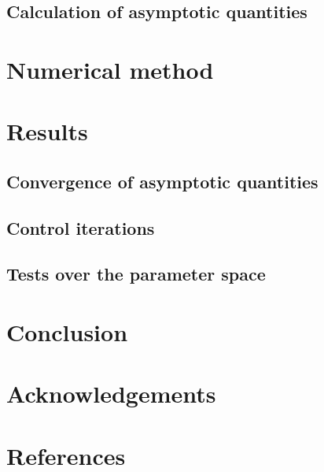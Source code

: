 \documentclass{../document}
\begin{document}
    \subsection{Calculation of asymptotic quantities}

  \section{Numerical method}
  
  \section{Results}

    \subsection{Convergence of asymptotic quantities}

    \subsection{Control iterations}

    \subsection{Tests over the parameter space}

  \section{Conclusion}

  \section*{Acknowledgements}

  \section*{References}

	  \printbibliography[heading=none]
  
\end{document}
